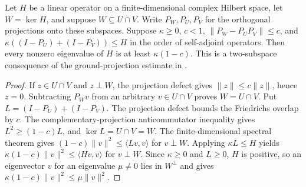 \begin{lemma}
    \label{thm:sharp_two_ground_projection_gap}
    \leanok
    Let $H$ be a linear operator on a finite-dimensional complex Hilbert
    space, let $W=\ker H$, and suppose $W\subseteq U\cap V$. Write
    $P_W,P_U,P_V$ for the orthogonal projections onto these subspaces.
    Suppose $\kappa\geq0$, $c<1$,
    $\|P_W-P_UP_V\|\leq c$, and
    $\kappa((I-P_U)+(I-P_V))\leq H$ in the order of self-adjoint
    operators. Then every nonzero eigenvalue of $H$ is at least
    $\kappa(1-c)$. This is a two-subspace consequence of the
    ground-projection estimate
    in \cite[Section~6, the three-interval commutation lemma,
        part~(ii)]{Nachtergaele1996Spectral}.
\end{lemma}
\begin{proof}\leanok
    If $z\in U\cap V$ and $z\perp W$, the projection defect gives
    $\|z\|\leq c\|z\|$, hence $z=0$. Subtracting $P_Wv$ from an
    arbitrary $v\in U\cap V$ proves $W=U\cap V$.
    Put $L=(I-P_U)+(I-P_V)$. The projection defect bounds the
    Friedrichs overlap by $c$. The complementary-projection
    anticommutator inequality gives $L^2\geq(1-c)L$, and
    $\ker L=U\cap V=W$. The finite-dimensional spectral theorem gives
    $(1-c)\|v\|^2\leq\langle Lv,v\rangle$ for $v\perp W$.
    Applying $\kappa L\leq H$ yields
    $\kappa(1-c)\|v\|^2\leq\langle Hv,v\rangle$ for $v\perp W$.
    Since $\kappa\geq0$ and $L\geq0$, $H$ is positive, so an eigenvector
    $v$ for an eigenvalue $\mu\neq0$ lies in $W^\perp$ and gives
    $\kappa(1-c)\|v\|^2\leq\mu\|v\|^2$.
\end{proof}

